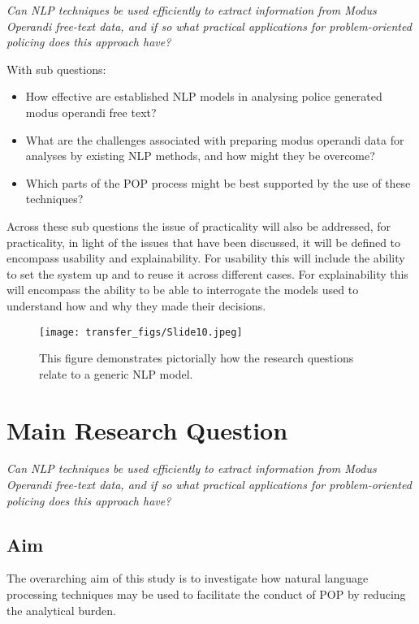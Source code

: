 \emph{Can NLP techniques be used efficiently to extract information from Modus Operandi free-text data, and if so what practical applications for problem-oriented policing does this approach have?}

With sub questions:
\begin{itemize}
\item How effective are established NLP models in analysing police generated modus operandi free text?

\item What are the challenges associated with preparing modus operandi data for analyses by existing NLP methods, and how might they be overcome?  

\item Which parts of the POP process might be best supported by the use of these techniques? 
\end{itemize}

Across these sub questions the issue of practicality will also be addressed, for practicality, in light of the issues that have been discussed, it will be defined to encompass usability and explainability. For usability this will include the ability to set the system up and to reuse it across different cases. For explainability this will encompass the ability to be able to interrogate the models used to understand how and why they made their decisions. 

\begin{figure}
  \texttt{[image: transfer\_figs/Slide10.jpeg]}
  \caption[Research Question Overview.]{This figure demonstrates pictorially how the research questions relate to a generic NLP model.}
  \label{fig:questions}
\end{figure}

\section{Main Research Question}

\emph{Can NLP techniques be used efficiently to extract information from Modus Operandi free-text data, and if so what practical applications for problem-oriented policing does this approach have?}

\subsection{Aim} 

The overarching aim of this study is to investigate how natural language processing techniques may be used to facilitate the conduct of POP by reducing the analytical burden. 


